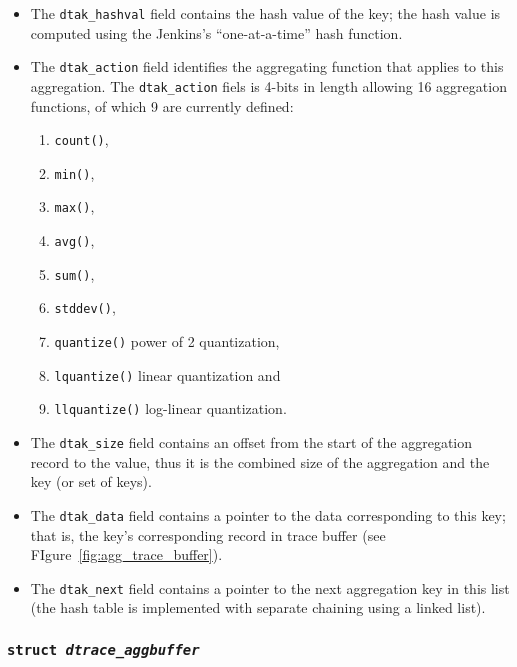 \begin{itemize}

	\item The \texttt{dtak\_hashval} field contains the hash value of the key;
the hash value is computed using the Jenkins's ``one-at-a-time'' hash function.

	\item The \texttt{dtak\_action} field identifies the aggregating function
that applies to this aggregation. The \texttt{dtak\_action} fiels is 4-bits in
length allowing 16 aggregation functions, of which 9 are currently defined:

	\begin{enumerate}

		\item \texttt{count()},  
		\item \texttt{min()},
		\item \texttt{max()},
		\item \texttt{avg()},
		\item \texttt{sum()},
		\item \texttt{stddev()},
		\item \texttt{quantize()} power of 2 quantization,
		\item \texttt{lquantize()} linear quantization and
		\item \texttt{llquantize()} log-linear quantization.

	\end{enumerate}

	\item The \texttt{dtak\_size} field contains an offset from the start of
the aggregation record to the value, thus it is the combined size of the
aggregation and the key (or set of keys).

	\item The \texttt{dtak\_data} field contains a pointer to the data
corresponding to this key; that is, the key's corresponding record in trace
buffer (see FIgure~\ref{fig:agg_trace_buffer}).

	\item The \texttt{dtak\_next} field contains a pointer to the next
aggregation key in this list (the hash table is implemented with separate
chaining using a linked list).

\end{itemize}

\subsubsection{\texttt{struct~\textit{dtrace\_aggbuffer}}}
\label{subsubsec:dtagb}

